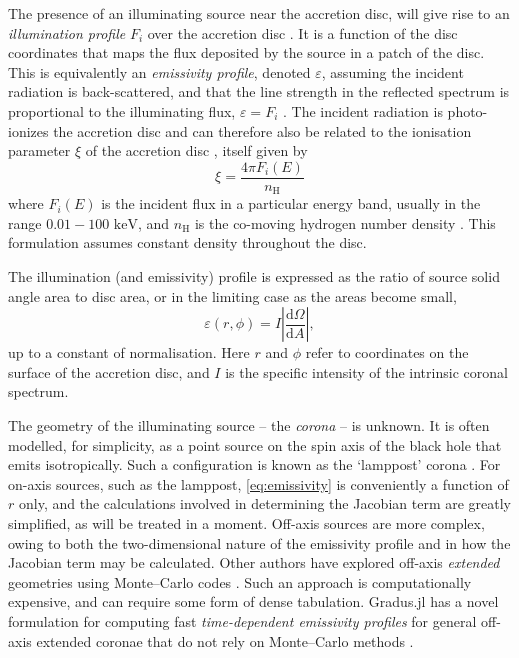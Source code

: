 \documentclass[fleqn,usenatbib]{mnras}
\newcommand{\software}[1]{{\sc #1}}
\newcommand{\Gradus}{\software{Gradus.jl}\xspace}
\renewcommand{\d}{\text{d}}
\begin{document}
The presence of an illuminating source near the accretion disc, will give rise
to an \emph{illumination profile} $F_i$ over the accretion disc
\citep{svensson_corona_1994}. It is a function of the disc coordinates that maps
the flux deposited by the source in a patch of the disc. This is equivalently an
\emph{emissivity profile}, denoted $\varepsilon$, assuming the incident
radiation is back-scattered, and that the line strength in the reflected
spectrum is proportional to the illuminating flux, $\varepsilon = F_i$
\citep{wilkins_understanding_2012}. The incident radiation is photo-ionizes the
accretion disc and can therefore also be related to the ionisation parameter
$\xi$ of the accretion disc \citep{laor_line_1991,ross_effects_1993}, itself
given by
\begin{equation}
    \xi = \frac{4 \pi F_i (E)}{n_\text{H}}
\end{equation}
where $F_i (E)$ is the incident flux in a particular energy band, usually in the
range $0.01 - 100 \text{ keV}$, and $n_\text{H}$ is the co-moving hydrogen
number density \citep{ross_effects_1993}. This formulation assumes constant
density throughout the disc.

The illumination (and emissivity) profile is expressed as the ratio of source
solid angle area to disc area, or in the limiting case as the areas become
small,
\begin{equation}
    \varepsilon (r, \phi) = I \left\lvert \frac{\d \Omega}{\d A} \right\rvert,
\end{equation} \label{eq:emissivity}
up to a constant of normalisation.
Here $r$ and $\phi$ refer to coordinates on the surface of the accretion disc,
and $I$ is the specific intensity of the intrinsic coronal spectrum.

The geometry of the illuminating source -- the \emph{corona} -- is unknown. It
is often modelled, for simplicity, as a point source on the spin axis of the
black hole that emits isotropically. Such a configuration is known as the
`lamppost' corona \citep[e.g.][]{fukumura_accretion_2007}. For on-axis sources,
such as the lamppost, \eqref{eq:emissivity} is conveniently a function of $r$
only, and the calculations involved in determining the Jacobian term are greatly
simplified, as will be treated in a moment. Off-axis sources are more complex,
owing to both the two-dimensional nature of the emissivity profile and in how
the Jacobian term may be calculated. Other authors have explored off-axis
\emph{extended} geometries using Monte--Carlo codes
\citep{wilkins_understanding_2012, wilkins_towards_2016, gonzalez_probing_2017}.
Such an approach is computationally expensive, and can require some form of
dense tabulation. \Gradus has a novel formulation for computing fast
\emph{time-dependent emissivity profiles} for general off-axis extended coronae
that do not rely on Monte--Carlo methods \citep{baker_2025}.
\end{document}

